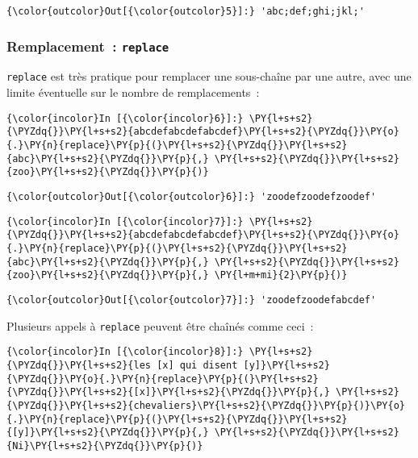 \begin{Verbatim}[commandchars=\\\{\}]
{\color{outcolor}Out[{\color{outcolor}5}]:} 'abc;def;ghi;jkl;'
\end{Verbatim}
            
    \hypertarget{remplacement-replace}{%
\subsubsection{\texorpdfstring{Remplacement~:
\texttt{replace}}{Remplacement~: replace}}\label{remplacement-replace}}

    \texttt{replace} est très pratique pour remplacer une sous-chaîne par
une autre, avec une limite éventuelle sur le nombre de remplacements~:

    \begin{Verbatim}[commandchars=\\\{\}]
{\color{incolor}In [{\color{incolor}6}]:} \PY{l+s+s2}{\PYZdq{}}\PY{l+s+s2}{abcdefabcdefabcdef}\PY{l+s+s2}{\PYZdq{}}\PY{o}{.}\PY{n}{replace}\PY{p}{(}\PY{l+s+s2}{\PYZdq{}}\PY{l+s+s2}{abc}\PY{l+s+s2}{\PYZdq{}}\PY{p}{,} \PY{l+s+s2}{\PYZdq{}}\PY{l+s+s2}{zoo}\PY{l+s+s2}{\PYZdq{}}\PY{p}{)}
\end{Verbatim}


\begin{Verbatim}[commandchars=\\\{\}]
{\color{outcolor}Out[{\color{outcolor}6}]:} 'zoodefzoodefzoodef'
\end{Verbatim}
            
    \begin{Verbatim}[commandchars=\\\{\}]
{\color{incolor}In [{\color{incolor}7}]:} \PY{l+s+s2}{\PYZdq{}}\PY{l+s+s2}{abcdefabcdefabcdef}\PY{l+s+s2}{\PYZdq{}}\PY{o}{.}\PY{n}{replace}\PY{p}{(}\PY{l+s+s2}{\PYZdq{}}\PY{l+s+s2}{abc}\PY{l+s+s2}{\PYZdq{}}\PY{p}{,} \PY{l+s+s2}{\PYZdq{}}\PY{l+s+s2}{zoo}\PY{l+s+s2}{\PYZdq{}}\PY{p}{,} \PY{l+m+mi}{2}\PY{p}{)}
\end{Verbatim}


\begin{Verbatim}[commandchars=\\\{\}]
{\color{outcolor}Out[{\color{outcolor}7}]:} 'zoodefzoodefabcdef'
\end{Verbatim}
            
    Plusieurs appels à \texttt{replace} peuvent être chaînés comme ceci~:

    \begin{Verbatim}[commandchars=\\\{\}]
{\color{incolor}In [{\color{incolor}8}]:} \PY{l+s+s2}{\PYZdq{}}\PY{l+s+s2}{les [x] qui disent [y]}\PY{l+s+s2}{\PYZdq{}}\PY{o}{.}\PY{n}{replace}\PY{p}{(}\PY{l+s+s2}{\PYZdq{}}\PY{l+s+s2}{[x]}\PY{l+s+s2}{\PYZdq{}}\PY{p}{,} \PY{l+s+s2}{\PYZdq{}}\PY{l+s+s2}{chevaliers}\PY{l+s+s2}{\PYZdq{}}\PY{p}{)}\PY{o}{.}\PY{n}{replace}\PY{p}{(}\PY{l+s+s2}{\PYZdq{}}\PY{l+s+s2}{[y]}\PY{l+s+s2}{\PYZdq{}}\PY{p}{,} \PY{l+s+s2}{\PYZdq{}}\PY{l+s+s2}{Ni}\PY{l+s+s2}{\PYZdq{}}\PY{p}{)}
\end{Verbatim}


